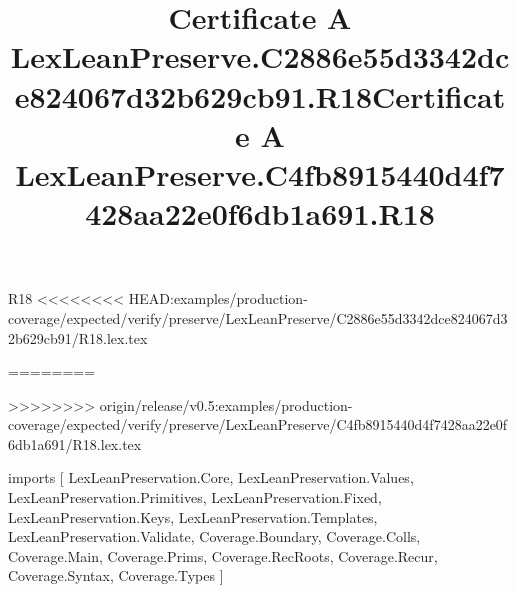 \begin{lexlean}{R18}
<<<<<<<< HEAD:examples/production-coverage/expected/verify/preserve/LexLeanPreserve/C2886e55d3342dce824067d32b629cb91/R18.lex.tex
\title{Certificate A LexLeanPreserve.C2886e55d3342dce824067d32b629cb91.R18}
========
\title{Certificate A LexLeanPreserve.C4fb8915440d4f7428aa22e0f6db1a691.R18}
>>>>>>>> origin/release/v0.5:examples/production-coverage/expected/verify/preserve/LexLeanPreserve/C4fb8915440d4f7428aa22e0f6db1a691/R18.lex.tex
\begin{coremodule}
imports [
  LexLeanPreservation.Core,
  LexLeanPreservation.Values,
  LexLeanPreservation.Primitives,
  LexLeanPreservation.Fixed,
  LexLeanPreservation.Keys,
  LexLeanPreservation.Templates,
  LexLeanPreservation.Validate,
  Coverage.Boundary,
  Coverage.Colls,
  Coverage.Main,
  Coverage.Prims,
  Coverage.RecRoots,
  Coverage.Recur,
  Coverage.Syntax,
  Coverage.Types
]


\end{coremodule}
\end{lexlean}
